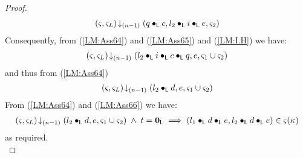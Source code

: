 \begin{lemma}[]
\begin{proof}
%
\begin{align}
	\left(\varsigma_{}, \varsigma_{L}\right) \!\downarrow_{(n-1)} \left(q\bullet_{\textsf{L}} c, l_2 \bullet_{\textsf{L}} i \bullet_{\textsf{L}} e, \varsigma_{2}\right) \label{LM:Ass65}
\end{align}
%
Consequently, from (\ref{LM:Ass64}) and (\ref{LM:Ass65}) and (\ref{LM:I.H}) we have:
%
\begin{align}
	\left(\varsigma_{}, \varsigma_{L}\right) \!\downarrow_{(n-1)} \left(l_2 \bullet_{\textsf{L}} i \bullet_{\textsf{L}} c \bullet_{\textsf{L}} q, e, \varsigma_{1} \cup \varsigma_{2}\right) \nonumber
\end{align}
and thus from (\ref{LM:Ass64})
%
\begin{align}
	\left(\varsigma_{}, \varsigma_{L}\right) \!\downarrow_{(n-1)} \left(l_2 \bullet_{\textsf{L}} d, e, \varsigma_{1} \cup \varsigma_{2}\right) \label{LM:Ass66}
\end{align}
From (\ref{LM:Ass64})  and (\ref{LM:Ass66}) we have:
\begin{align}
	\left(\varsigma_{}, \varsigma_{L}\right) \!\downarrow_{(n-1)} \left(l_2 \bullet_{\textsf{L}} d, e, \varsigma_{1} \cup \varsigma_{2}\right) \;\land\; t = \mathbf{0}_{\textsf{L}} \implies (l_1 \bullet_{\textsf{L}} d \bullet_{\textsf{L}} e, l_2 \bullet_{\textsf{L}} d \bullet_{\textsf{L}} e) \in \varsigma_{}(\kappa_{})   \nonumber
\end{align}
%
as required.\\
%
%
%
%
%


\end{proof}
\end{lemma}
